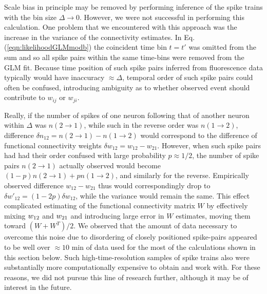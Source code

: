 Scale bias in principle may be removed by performing inference of the spike trains with the bin size $\Delta \rightarrow 0$. However, we were not successful in performing this calculation. One problem that we encountered with this approach was the increase in the variance of the connectivity estimates. In Eq.(\ref{eqn:likelihoodGLMmodb}) the coincident time bin $t=t'$ was omitted from the sum and so all spike pairs within the same time-bins were removed from the GLM fit. Because time position of such spike pairs inferred from fluorescence data typically would have inaccuracy $\approx \Delta$, temporal order of such spike pairs could often be confused, introducing ambiguity as to whether observed event should contribute to $w_{ij}$ or $w_{ji}$.

Really, if the number of spikes of one neuron following that of another neuron within $\Delta$ was $n(2\rightarrow 1)$, while such in the reverse order was $n(1\rightarrow 2)$, difference $\delta n_{12} = n(2\rightarrow 1)-n(1\rightarrow 2)$ would correspond to the difference of functional connectivity weights $\delta w_{12}=w_{12}-w_{21}$. However, when such spike pairs had had their order confused with large probability $p\approx 1/2$, the number of spike pairs $n(2\rightarrow 1)$ actually observed would become $(1-p) n(2\rightarrow 1)+p n(1\rightarrow 2)$, and similarly for the reverse. Empirically observed difference $w_{12}-w_{21}$ thus would correspondingly drop to $\delta w'_{12}= (1-2p)\delta w_{12}$, while the variance would remain the same. This effect complicated estimating of the functional connectivity matrix $W$ by effectively mixing $w_{12}$ and $w_{21}$ and introducing large error in $W$ estimates, moving them toward $(W+W^T)/2$.
We observed that the amount of data necessary to overcome this noise due to disordering of closely positioned spike-pairs appeared to be well over $\approx 10$ min of data used for the most of the calculations shown in this section below. Such high-time-resolution samples of spike trains also were substantially more computationally expensive to obtain and work with. For these reasons, we did not pursue this line of research further, although it may be of interest in the future.


